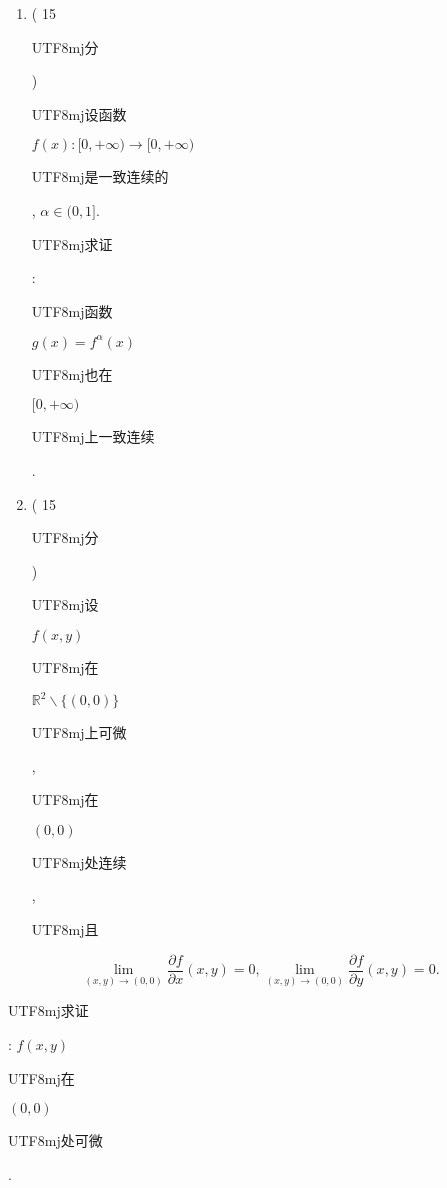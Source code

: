 \documentclass[10pt]{article}
\begin{document}
\begin{enumerate}
  \item ( 15 \begin{CJK}{UTF8}{mj}分\end{CJK}) \begin{CJK}{UTF8}{mj}设函数\end{CJK} $f(x):[0,+\infty) \rightarrow[0,+\infty)$ \begin{CJK}{UTF8}{mj}是一致连续的\end{CJK}, $\alpha \in(0,1]$. \begin{CJK}{UTF8}{mj}求证\end{CJK}: \begin{CJK}{UTF8}{mj}函数\end{CJK} $g(x)=f^{\alpha}(x)$ \begin{CJK}{UTF8}{mj}也在\end{CJK} $[0,+\infty)$ \begin{CJK}{UTF8}{mj}上一致连续\end{CJK}.

  \item ( 15 \begin{CJK}{UTF8}{mj}分\end{CJK}) \begin{CJK}{UTF8}{mj}设\end{CJK} $f(x, y)$ \begin{CJK}{UTF8}{mj}在\end{CJK} $\mathbb{R}^{2} \backslash\{(0,0)\}$ \begin{CJK}{UTF8}{mj}上可微\end{CJK}, \begin{CJK}{UTF8}{mj}在\end{CJK} $(0,0)$ \begin{CJK}{UTF8}{mj}处连续\end{CJK}, \begin{CJK}{UTF8}{mj}且\end{CJK}

\end{enumerate}
$$
\lim _{(x, y) \rightarrow(0,0)} \frac{\partial f}{\partial x}(x, y)=0, \lim _{(x, y) \rightarrow(0,0)} \frac{\partial f}{\partial y}(x, y)=0 .
$$
\begin{CJK}{UTF8}{mj}求证\end{CJK}: $f(x, y)$ \begin{CJK}{UTF8}{mj}在\end{CJK} $(0,0)$ \begin{CJK}{UTF8}{mj}处可微\end{CJK}.
\end{document}

